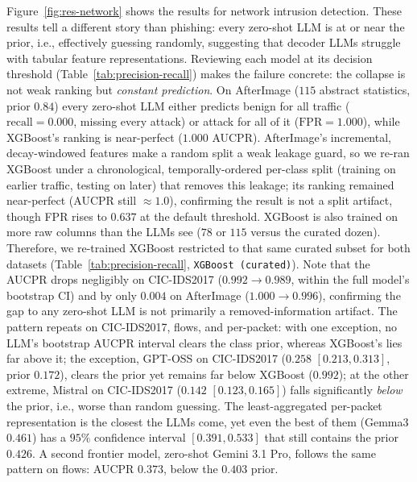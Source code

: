 \documentclass{jmlr}
\begin{document}

\noindent Figure~\ref{fig:res-network} shows the results for network intrusion detection. These results tell a different story than phishing: every zero-shot LLM is at or near the prior, i.e., effectively guessing randomly, suggesting that decoder LLMs struggle with tabular feature representations. Reviewing each model at its decision threshold (Table~\ref{tab:precision-recall}) makes the failure concrete: the collapse is not weak ranking but \emph{constant prediction}. On AfterImage ($115$ abstract statistics, prior $0.84$) every zero-shot LLM either predicts benign for all traffic ($\mathrm{recall}=0.000$, missing every attack) or attack for all of it ($\mathrm{FPR}=1.000$), while XGBoost's ranking is near-perfect ($1.000$ AUCPR). AfterImage's incremental, decay-windowed features \citep{mirsky2018kitsune} make a random split a weak leakage guard, so we re-ran XGBoost under a chronological, temporally-ordered per-class split (training on earlier traffic, testing on later) that removes this leakage; its ranking remained near-perfect (AUCPR still ${\approx}1.0$), confirming the result is not a split artifact, though FPR rises to $0.637$ at the default threshold. XGBoost is also trained on more raw columns than the LLMs see ($78$ or $115$ versus the curated dozen). Therefore, we re-trained XGBoost restricted to that same curated subset for both datasets (Table~\ref{tab:precision-recall}, \texttt{XGBoost (curated)}). Note that the AUCPR drops negligibly on CIC-IDS2017 ($0.992\!\to\!0.989$, within the full model's bootstrap CI) and by only $0.004$ on AfterImage ($1.000\!\to\!0.996$), confirming the gap to any zero-shot LLM is not primarily a removed-information artifact. The pattern repeats on CIC-IDS2017, flows, and per-packet: with one exception, no LLM's bootstrap AUCPR interval clears the class prior, whereas XGBoost's lies far above it; the exception, GPT-OSS on CIC-IDS2017 ($0.258$ $[0.213, 0.313]$, prior $0.172$), clears the prior yet remains far below XGBoost ($0.992$); at the other extreme, Mistral on CIC-IDS2017 ($0.142$ $[0.123, 0.165]$) falls significantly \emph{below} the prior, i.e., worse than random guessing. The least-aggregated per-packet representation is the closest the LLMs come, yet even the best of them (Gemma3 $0.461$) has a $95\%$ confidence interval $[0.391, 0.533]$ that still contains the prior $0.426$. A second frontier model, zero-shot Gemini 3.1 Pro, follows the same pattern on flows: AUCPR $0.373$, below the $0.403$ prior.

\end{document}
